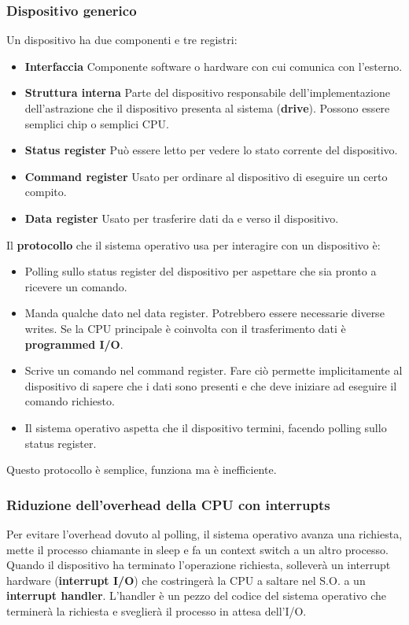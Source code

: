 \documentclass[12pt, letterpaper]{article}
\begin{document}
			\subsubsection{Dispositivo generico}
				Un dispositivo ha due componenti e tre registri: 
				\begin{itemize}
					\item \textbf{Interfaccia} Componente software o hardware con cui comunica con l'esterno.
					\item \textbf{Struttura interna} Parte del dispositivo responsabile dell'implementazione dell'astrazione che il dispositivo presenta al sistema (\textbf{drive}). Possono essere semplici chip o semplici CPU. 
					\item \textbf{Status register} Può essere letto per vedere lo stato corrente del dispositivo.
					\item \textbf{Command register} Usato per ordinare al dispositivo di eseguire un certo compito.
					\item \textbf{Data register} Usato per trasferire dati da e verso il dispositivo. 
				\end{itemize}
				Il \textbf{protocollo} che il sistema operativo usa per interagire con un dispositivo è:
				\begin{itemize}
					\item Polling sullo status register del dispositivo per aspettare che sia pronto a ricevere un comando. 
					\item Manda qualche dato nel data register. Potrebbero essere necessarie diverse writes. Se la CPU principale è coinvolta con il trasferimento dati  è \textbf{programmed I/O}.
					\item Scrive un comando nel command register. Fare ciò permette implicitamente al dispositivo di sapere che i dati sono presenti e che deve iniziare ad eseguire il comando richiesto.
					\item Il sistema operativo aspetta che il dispositivo termini, facendo polling sullo status register.
				\end{itemize}
				Questo protocollo è semplice, funziona ma è inefficiente. 
				
			\subsubsection{Riduzione dell'overhead della CPU con interrupts}
				Per evitare l'overhead dovuto al polling, il sistema operativo avanza una richiesta, mette il processo chiamante in sleep e fa un context switch a un altro processo. Quando il dispositivo ha terminato l'operazione richiesta, solleverà un interrupt hardware (\textbf{interrupt I/O}) che costringerà la CPU a saltare nel S.O. a un \textbf{interrupt handler}. L'handler è un pezzo del codice del sistema operativo che terminerà la richiesta e sveglierà il processo in attesa dell'I/O. 
				
\end{document}

